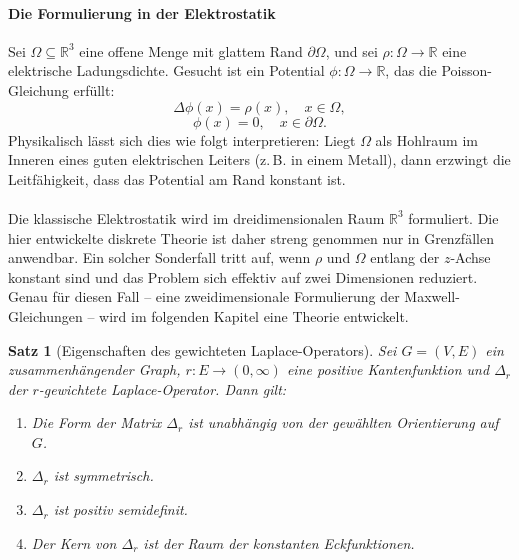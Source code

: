 \documentclass[11pt,a4paper,leqno]{report}
\newtheorem{proposition}{Satz}[chapter]
\numberwithin{equation}{chapter}
\begin{document}
\paragraph{Die Formulierung in der Elektrostatik}
Sei $\Omega \subseteq \mathbb{R}^3$ eine offene Menge mit glattem Rand $\partial\Omega$, 
und sei $\rho:\Omega \to \mathbb{R}$ eine elektrische Ladungsdichte. 
Gesucht ist ein Potential $\phi:\Omega \to \mathbb{R}$, das die Poisson-Gleichung erfüllt:
\begin{equation}
	\Delta \phi(x) = \rho(x), \quad x \in \Omega,
\end{equation}
\begin{equation}
	\phi(x) = 0, \quad x \in \partial\Omega.
\end{equation}
\noindent
Physikalisch lässt sich dies wie folgt interpretieren: 
Liegt $\Omega$ als Hohlraum im Inneren eines guten elektrischen Leiters (z.\,B. in einem Metall), 
dann erzwingt die Leitfähigkeit, dass das Potential am Rand konstant ist. \\
\\
Die klassische Elektrostatik wird im drei\-dimensionalen Raum $\mathbb{R}^3$ formuliert. 
Die hier entwickelte diskrete Theorie ist daher streng genommen nur in Grenzfällen anwendbar. 
Ein solcher Sonderfall tritt auf, wenn $\rho$ und $\Omega$ entlang der $z$-Achse konstant sind 
und das Problem sich effektiv auf zwei Dimensionen reduziert. 
Genau für diesen Fall – eine zweidimensionale Formulierung der Maxwell-Gleichungen – 
wird im folgenden Kapitel eine Theorie entwickelt. 
\begin{proposition}[Eigenschaften des gewichteten Laplace-Operators]
	Sei $G=(V,E)$ ein zusammenhängender Graph, $r:E\to (0,\infty)$ eine positive Kantenfunktion 
	und $\Delta_r$ der $r$-gewichtete Laplace-Operator. Dann gilt:
	\begin{enumerate}
		\item Die Form der Matrix $\Delta_r$ ist unabhängig von der gewählten Orientierung auf $G$.
		\item $\Delta_r$ ist symmetrisch.
		\item $\Delta_r$ ist positiv semidefinit.
		\item Der Kern von $\Delta_r$ ist der Raum der konstanten Eckfunktionen.
	\end{enumerate}
\end{proposition}
\end{document}
